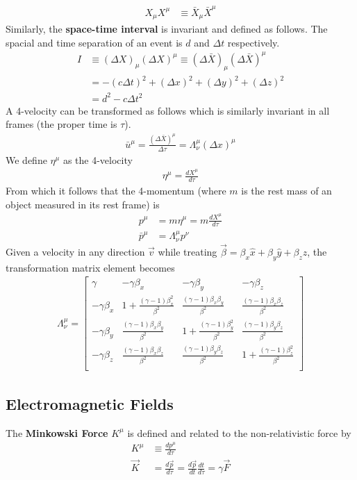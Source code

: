 \begin{multicols}{2}
\begin{align}
	X_\mu X^\mu &\equiv \bar{X}_\mu\bar{X}^\mu 
\end{align}
Similarly, the \textbf{space-time interval} is invariant and defined as follows. The spacial and time separation of an event is $d$ and $\Delta t$ respectively. 
\begin{align}
	I &\equiv (\Delta X)_\mu (\Delta X)^\mu \equiv (\Delta \bar{X})_\mu(\Delta \bar{X})^\mu \\
	&= -(c\Delta t)^2+(\Delta x)^2+(\Delta y)^2+(\Delta z)^2 \\
	& = d^2-c \Delta t^2
\end{align}
A 4-velocity can be transformed as follows which is similarly invariant in all frames (the proper time is $\tau$). 
\begin{align}
	\bar{u}^\mu=\frac{(\Delta \bar{X})^\mu}{\Delta \tau} = \Lambda_\nu^\mu(\Delta x)^\mu
\end{align}
We define $\eta^\mu$ as the 4-velocity
\begin{align}
	\eta^\mu = \frac{dX^\mu}{d\tau}
\end{align} 
From which it follows that the 4-momentum (where $m$ is the rest mass of an object measured in its rest frame) is
\begin{align}
	p^\mu &= m\eta^\mu = m\frac{dX^\mu}{d\tau} \\
	\bar{p}^\mu &= \Lambda_\nu^\mu p^\nu
\end{align}
Given a velocity in any direction $\vec{v}$ while treating $\vec{\beta} = \beta_x \hat{x}+\beta_y \hat{y}+\beta_z \hat{z}$, the transformation matrix element becomes
\begin{align}
	\Lambda_\nu^\mu = 
	\begin{bmatrix}
		\gamma & -\gamma \beta_x & -\gamma \beta_y & -\gamma \beta_z \\
		-\gamma \beta_x & 1+ \frac{(\gamma-1)\beta_x^2}{\beta^2} & \frac{(\gamma-1)\beta_x\beta_y}{\beta^2} & \frac{(\gamma-1)\beta_x\beta_z}{\beta^2}\\
		-\gamma \beta_y & \frac{(\gamma-1)\beta_x\beta_y}{\beta^2} & 1+ \frac{(\gamma-1)\beta_y^2}{\beta^2} & \frac{(\gamma-1)\beta_y\beta_z}{\beta^2}  \\
		-\gamma \beta_z & \frac{(\gamma-1)\beta_x\beta_z}{\beta^2} & \frac{(\gamma-1)\beta_y\beta_z}{\beta^2} & 1+ \frac{(\gamma-1)\beta_z^2}{\beta^2}  \\
	\end{bmatrix}
\end{align}
\subsection{Electromagnetic Fields}
The \textbf{Minkowski Force} $K^\mu$ is defined and related to the non-relativistic force by
\begin{align}
	K^\mu &\equiv \frac{dp^\mu}{d\tau} \\
	\vec{K} &= \frac{d\vec{p}}{d\tau} =\frac{d\vec{p}}{dt}\frac{dt}{d\tau} =  \gamma \vec{F}
\end{align}

\end{multicols}
